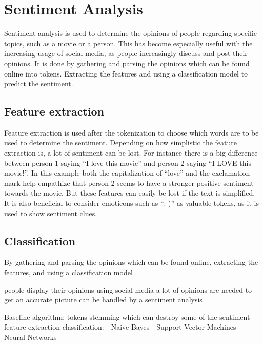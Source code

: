\section{Sentiment Analysis}

Sentiment analysis is used to determine the opinions of people regarding
specific topics, such as a movie or a person. This has become especially useful
with the increasing usage of social media, as people increasingly discuss and
post their opinions. It is done by gathering and parsing the opinions which can
be found online into tokens. Extracting the features and using a classification
model to predict the sentiment.

\subsection{Feature extraction} 
Feature extraction is used after the tokenization to choose which words are to
be used to determine the sentiment. Depending on how simplistic the feature
extraction is, a lot of sentiment can be lost. For instance there is a big
difference between person 1 saying ``I love this movie'' and person 2 saying
``I LOVE this movie!''. In this example both the capitalization of ``love'' and
the exclamation mark help empathize that person 2 seems to have a stronger
positive sentiment towards the movie. But these features can easily be lost if
the text is simplified. It is also beneficial to consider emoticons such as
``:-)'' as valuable tokens, as it is used to show sentiment clues.




\subsection{Classification}


 By
gathering and parsing the opinions which can be found online, extracting
the features, and using a classification model

people display their opinions using social media
a lot of opinions are needed to get an accurate picture
can be handled by a sentiment analysis



Baseline algorithm:
tokens
stemming which can destroy some of the sentiment
feature extraction
classification:
- Naive Bayes
- Support Vector Machines
- Neural Networks

